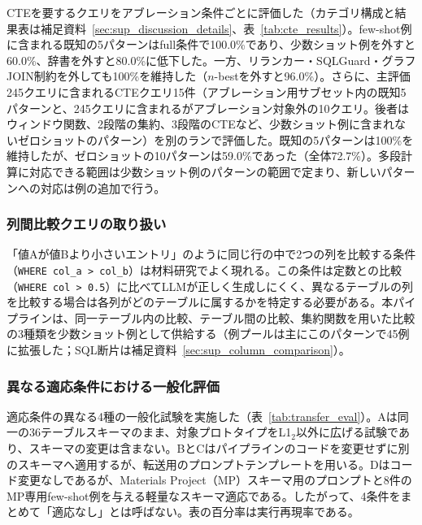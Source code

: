 \documentclass[twocolumn]{interact}
\begin{document}
CTEを要するクエリをアブレーション条件ごとに評価した（カテゴリ構成と結果表は補足資料~\ref{sec:sup_discussion_details}、表~\ref{tab:cte_results}）。few-shot例に含まれる既知の5パターンはfull条件で100.0\%であり、少数ショット例を外すと60.0\%、辞書を外すと80.0\%に低下した。一方、リランカー・SQLGuard・グラフJOIN制約を外しても100\%を維持した（$n$-bestを外すと96.0\%）。さらに、主評価245クエリに含まれるCTEクエリ15件（アブレーション用サブセット内の既知5パターンと、245クエリに含まれるがアブレーション対象外の10クエリ。後者はウィンドウ関数、2段階の集約、3段階のCTEなど、少数ショット例に含まれないゼロショットのパターン）を別のランで評価した。既知の5パターンは100\%を維持したが、ゼロショットの10パターンは59.0\%であった（全体72.7\%）。多段計算に対応できる範囲は少数ショット例のパターンの範囲で定まり、新しいパターンへの対応は例の追加で行う。

\subsubsection{列間比較クエリの取り扱い}
\label{sec:column_comparison}

「値Aが値Bより小さいエントリ」のように同じ行の中で2つの列を比較する条件（\texttt{WHERE col\_a > col\_b}）は材料研究でよく現れる。この条件は定数との比較（\texttt{WHERE col > 0.5}）に比べてLLMが正しく生成しにくく、異なるテーブルの列を比較する場合は各列がどのテーブルに属するかを特定する必要がある。本パイプラインは、同一テーブル内の比較、テーブル間の比較、集約関数を用いた比較の3種類を少数ショット例として供給する（例プールは主にこのパターンで45例に拡張した；SQL断片は補足資料~\ref{sec:sup_column_comparison}）。

\subsubsection{異なる適応条件における一般化評価}
\label{sec:transfer_eval}

適応条件の異なる4種の一般化試験を実施した（表~\ref{tab:transfer_eval}）。Aは同一の36テーブルスキーマのまま、対象プロトタイプをL1$_2$以外に広げる試験であり、スキーマの変更は含まない。BとCはパイプラインのコードを変更せずに別のスキーマへ適用するが、転送用のプロンプトテンプレートを用いる。Dはコード変更なしであるが、Materials Project（MP）スキーマ用のプロンプトと8件のMP専用few-shot例を与える軽量なスキーマ適応である。したがって、4条件をまとめて「適応なし」とは呼ばない。表の百分率は実行再現率である。
\end{document}
